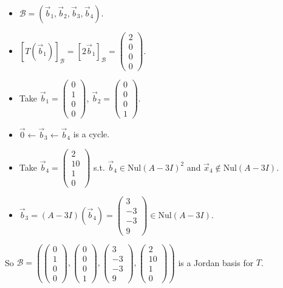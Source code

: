\documentclass[11pt,fleqn]{book} %
\begin{document}
\begin{example}
\begin{itemize}
        \begin{itemize}
            \item $\mathcal{B} = (\vec{b}_1, \vec{b}_2, \vec{b}_3, \vec{b}_4)$.
            \item $[T(\vec{b}_1)]_\mathcal{B} = [2\vec{b}_1]_\mathcal{B} = \begin{pmatrix} 2\\0\\0\\0 \end{pmatrix}$. 
            \item Take $\vec{b}_1 = \begin{pmatrix} 0\\1\\0\\0 \end{pmatrix}$, $\vec{b}_2 = \begin{pmatrix} 0\\0\\0\\1 \end{pmatrix}$.
            \item $\vec{0} \leftarrow \vec{b}_3 \leftarrow \vec{b}_4$ is a cycle. 
            \item Take $\vec{b}_4 = \begin{pmatrix} 2\\10\\1\\0 \end{pmatrix}$ s.t. $\vec{b}_4 \in \mathrm{Nul}(A - 3I)^2$ and $\vec{x}_4 \notin \mathrm{Nul}(A - 3I)$. 
            \item $\vec{b}_3 = (A - 3I)(\vec{b}_4) = \begin{pmatrix} 3\\-3\\-3\\9 \end{pmatrix} \in \mathrm{Nul}(A - 3I)$. 
        \end{itemize}
        
        So $\mathcal{B} = \left( \begin{pmatrix} 0\\1\\0\\0 \end{pmatrix}, \begin{pmatrix} 0\\0\\0\\1 \end{pmatrix}, \begin{pmatrix} 3\\-3\\-3\\9 \end{pmatrix}, \begin{pmatrix} 2\\10\\1\\0 \end{pmatrix} \right)$ is a Jordan basis for $T$. 
    \end{itemize}
\end{example}
\end{document}
